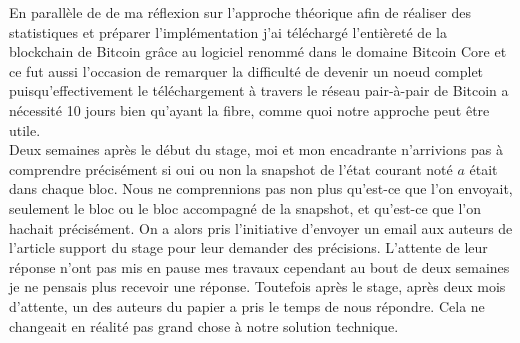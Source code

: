 \documentclass[12pt,a4paper]{article}
\begin{document}
	En parallèle de de ma réflexion sur l'approche théorique afin de réaliser des statistiques et préparer l'implémentation j'ai téléchargé l'entièreté de la blockchain de Bitcoin grâce au logiciel renommé dans le domaine Bitcoin Core et ce fut aussi l'occasion de remarquer la difficulté de devenir un noeud complet puisqu'effectivement le téléchargement à travers le réseau pair-à-pair de Bitcoin a nécessité 10 jours bien qu'ayant la fibre, comme quoi notre approche peut être utile.\\
	Deux semaines après le début du stage, moi et mon encadrante n'arrivions pas à comprendre précisément si oui ou non la snapshot de l'état courant noté $a$ était dans chaque bloc. Nous ne comprennions pas non plus qu'est-ce que l'on envoyait, seulement le bloc ou le bloc accompagné de la snapshot, et qu'est-ce que l'on hachait précisément. On a alors pris l'initiative d'envoyer un email aux auteurs de l'article support du stage pour leur demander des précisions. L'attente de leur réponse n'ont pas mis en pause mes travaux cependant au bout de deux semaines je ne pensais plus recevoir une réponse. Toutefois après le stage, après deux mois d'attente, un des auteurs du papier a pris le temps de nous répondre. Cela ne changeait en réalité pas grand chose à notre solution technique.\\
	
\end{document}
